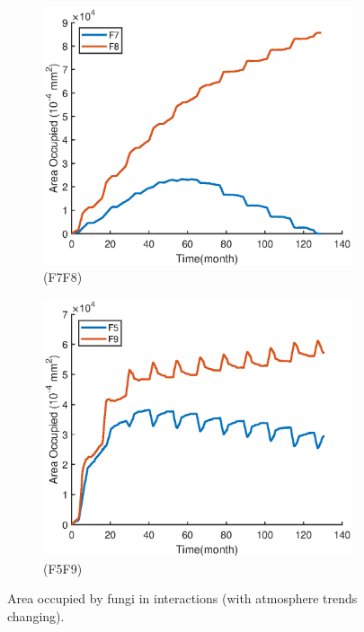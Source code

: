 \documentclass[a4paper,12pt]{article}
\begin{document}
\begin{figure}[H]
	\begin{subfigure}{0.4\textwidth}
		\includegraphics[width=\textwidth]{./4/E_F7F8_area.eps}
		\caption{(F7F8)}
		\label{E_F7F8_area}
	\end{subfigure}
	\begin{subfigure}{0.4\textwidth}
		\includegraphics[width=\textwidth]{./4/E_F5F9_area_2.eps}
		\caption{(F5F9)}
		\label{E_F5F9_area}
	\end{subfigure}
	\caption{Area occupied by fungi in interactions (with atmosphere trends changing).}
	\label{E_area}
	\end{figure}
\end{document}
